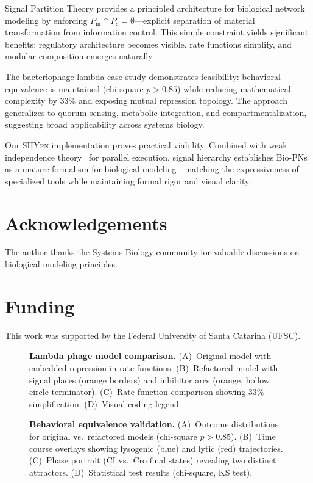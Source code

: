 \documentclass[twocolumn,10pt]{article}
\newcommand{\Pm}{P_{\text{m}}}
\newcommand{\Ps}{P_{\text{s}}}
\newcommand{\shypn}{\textsc{SHYpn}}
\begin{document}
Signal Partition Theory provides a principled architecture for biological network modeling by enforcing $\Pm \cap \Ps = \emptyset$---explicit separation of material transformation from information control. This simple constraint yields significant benefits: regulatory architecture becomes visible, rate functions simplify, and modular composition emerges naturally.

The bacteriophage lambda case study demonstrates feasibility: behavioral equivalence is maintained (chi-square $p>0.85$) while reducing mathematical complexity by 33\% and exposing mutual repression topology. The approach generalizes to quorum sensing, metabolic integration, and compartmentalization, suggesting broad applicability across systems biology.

Our \shypn{} implementation proves practical viability. Combined with weak independence theory~\cite{simao2025weak} for parallel execution, signal hierarchy establishes Bio-PNs as a mature formalism for biological modeling---matching the expressiveness of specialized tools while maintaining formal rigor and visual clarity.

\section*{Acknowledgements}

The author thanks the Systems Biology community for valuable discussions on biological modeling principles.

\section*{Funding}

This work was supported by the Federal University of Santa Catarina (UFSC).




\begin{figure}[t]
\centering
\caption{\textbf{Lambda phage model comparison.} (A)~Original model with embedded repression in rate functions. (B)~Refactored model with signal places (orange borders) and inhibitor arcs (orange, hollow circle terminator). (C)~Rate function comparison showing 33\% simplification. (D)~Visual coding legend.}
\label{fig:comparison}
\end{figure}

\begin{figure}[t]
\centering
\caption{\textbf{Behavioral equivalence validation.} (A)~Outcome distributions for original vs.~refactored models (chi-square $p>0.85$). (B)~Time course overlays showing lysogenic (blue) and lytic (red) trajectories. (C)~Phase portrait (CI vs.~Cro final states) revealing two distinct attractors. (D)~Statistical test results (chi-square, KS test).}
\label{fig:validation}
\end{figure}
\end{document}
